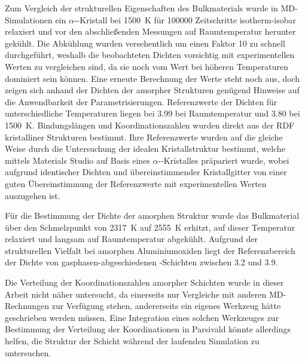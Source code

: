 Zum Vergleich der strukturellen Eigenschaften des Bulkmaterials wurde in MD-Simulationen ein $\alpha$--Kristall bei \SI{1500}{\kelvin} für \num{100000} Zeitschritte isotherm-isobar relaxiert und vor den abschließenden Messungen auf Raumtemperatur herunter gekühlt.
Die Abkühlung wurden versehentlich um einen Faktor 10 zu schnell durchgeführt, weshalb die beobachteten Dichten vorsichtig mit experimentellen Werten zu vergleichen sind, da sie noch vom Wert bei höheren Temperaturen dominiert sein können.
Eine erneute Berechnung der Werte steht noch aus, doch zeigen sich anhand der Dichten der amorpher Strukturen genügend Hinweise auf die Anwendbarkeit der Parametrisierungen.
Referenzwerte der Dichten für unterschiedliche Temperaturen liegen bei \SI{3.99}{\gpcc} bei Raumtemperatur und \SI{3.80}{\gpcc} bei \SI{1500}{\kelvin}\cite{fiquet_high-temperature_1999}.
Bindungslängen und Koordinationszahlen wurden direkt aus der RDF kristalliner Strukturen bestimmt.
Ihre Referenzwerte wurden auf die gleiche Weise durch die Untersuchung der idealen Kristallstruktur bestimmt, welche mittels Materials Studio\cite{biovia_materials_2014} auf Basis eines $\alpha$--Kristalles präpariert wurde, wobei aufgrund identischer Dichten und übereinstimmender Kristallgitter\cite{haynes_crc_2011} von einer guten Übereinstimmung der Referenzwerte mit experimentellen Werten auszugehen ist.

Für die Bestimmung der Dichte der amorphen Struktur wurde das Bulkmaterial über den Schmelzpunkt von \SI{2317}{\kelvin} auf \SI{2555}{\kelvin} erhitzt, auf dieser Temperatur relaxiert und langsam auf Raumtemperatur abgekühlt.
Aufgrund der strukturellen Vielfalt bei amorphen Aluminiumoxiden liegt der Referenzbereich der Dichte von gasphasen-abgeschiedenen -Schichten zwischen \SI{3.2}{\gpcc} und \SI{3.9}{\gpcc}\cite{wang_dependence_1997}.

Die Verteilung der Koordinationszahlen amorpher Schichten wurde in dieser Arbeit nicht näher untersucht, da einerseits nur Vergleiche mit anderen MD-Rechnungen zur Verfügung stehen\cite{gutierrez_molecular_2002}, andererseits ein eigenes Werkzeug hätte geschrieben werden müssen.
Eine Integration eines solchen Werkzeuges zur Bestimmung der Verteilung der Koordinationen in Parsivald könnte allerdings helfen, die Struktur der Schicht während der laufenden Simulation zu untersuchen.

